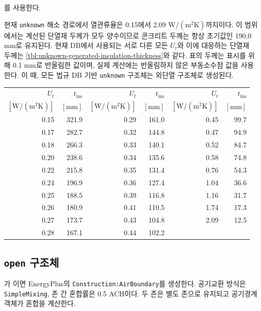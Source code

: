 를 사용한다.

현재 \texttt{unknown} 해소 경로에서 열관류율은 0.15에서 2.09 $\mathrm{W/(m^2K)}$까지이다. 이 범위에서는 계산된 단열재 두께가 모두 양수이므로 콘크리트 두께는 항상 초기값인 190.0 mm로 유지된다. 현재 DB에서 사용되는 서로 다른 모든 $U_t$와 이에 대응하는 단열재 두께는 \cref{tbl:unknown-generated-insulation-thickness}와 같다. 표의 두께는 표시를 위해 0.1 mm로 반올림한 값이며, 실제 계산에는 반올림하지 않은 부동소수점 값을 사용한다. 이 때, 모든 법규 DB 기반 \texttt{unknown} 구조체는 외단열 구조체로 생성된다. 

\begin{defaulttable}
  \caption{내장 DB의 목표 열관류율별 생성 단열재 두께}
  \label{tbl:unknown-generated-insulation-thickness}
  {\small
  \begin{tabular}{rr@{\qquad}rr@{\qquad}rr}
    \toprule
    $U_t$ & $t_{\mathrm{ins}}$
      & $U_t$ & $t_{\mathrm{ins}}$
      & $U_t$ & $t_{\mathrm{ins}}$ \\
    $[\mathrm{W/(m^2K)}]$ & $[\mathrm{mm}]$
      & $[\mathrm{W/(m^2K)}]$ & $[\mathrm{mm}]$
      & $[\mathrm{W/(m^2K)}]$ & $[\mathrm{mm}]$ \\ \midrule
    0.15 & 321.9 & 0.29 & 161.0 & 0.45 & 99.7 \\
    0.17 & 282.7 & 0.32 & 144.8 & 0.47 & 94.9 \\
    0.18 & 266.3 & 0.33 & 140.1 & 0.52 & 84.7 \\
    0.20 & 238.6 & 0.34 & 135.6 & 0.58 & 74.8 \\
    0.22 & 215.8 & 0.35 & 131.4 & 0.76 & 54.3 \\
    0.24 & 196.9 & 0.36 & 127.4 & 1.04 & 36.6 \\
    0.25 & 188.5 & 0.39 & 116.8 & 1.16 & 31.7 \\
    0.26 & 180.9 & 0.41 & 110.5 & 1.74 & 17.3 \\
    0.27 & 173.7 & 0.43 & 104.8 & 2.09 & 12.5 \\
    0.28 & 167.1 & 0.44 & 102.2 &      &      \\
    \bottomrule
  \end{tabular}
  }
\end{defaulttable}

\subsection{\texttt{open} 구조체}

가 이면 EnergyPlus의 \texttt{Construction:AirBoundary}를 생성한다. 공기교환 방식은 \texttt{SimpleMixing}, 존 간 혼합률은 0.5 ACH이다. 두 존은 별도 존으로 유지되고 공기경계 객체가 혼합을 계산한다.

